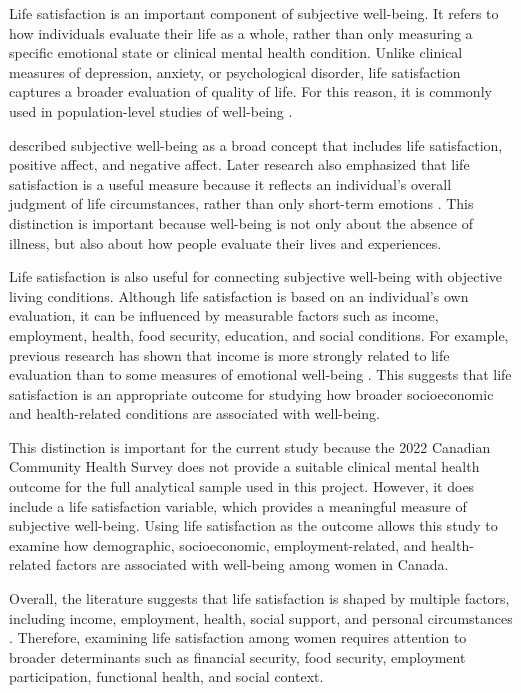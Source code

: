 \documentclass[12pt]{article}
\begin{document}
Life satisfaction is an important component of subjective well-being. It refers to how individuals evaluate their life as a whole, rather than only measuring a specific emotional state or clinical mental health condition. Unlike clinical measures of depression, anxiety, or psychological disorder, life satisfaction captures a broader evaluation of quality of life. For this reason, it is commonly used in population-level studies of well-being \citep{diener1984, diener1999}.

\citet{diener1984} described subjective well-being as a broad concept that includes life satisfaction, positive affect, and negative affect. Later research also emphasized that life satisfaction is a useful measure because it reflects an individual's overall judgment of life circumstances, rather than only short-term emotions \citep{diener1999, diener2013}. This distinction is important because well-being is not only about the absence of illness, but also about how people evaluate their lives and experiences.

Life satisfaction is also useful for connecting subjective well-being with objective living conditions. Although life satisfaction is based on an individual's own evaluation, it can be influenced by measurable factors such as income, employment, health, food security, education, and social conditions. For example, previous research has shown that income is more strongly related to life evaluation than to some measures of emotional well-being \citep{kahneman2010}. This suggests that life satisfaction is an appropriate outcome for studying how broader socioeconomic and health-related conditions are associated with well-being.

This distinction is important for the current study because the 2022 Canadian Community Health Survey does not provide a suitable clinical mental health outcome for the full analytical sample used in this project. However, it does include a life satisfaction variable, which provides a meaningful measure of subjective well-being. Using life satisfaction as the outcome allows this study to examine how demographic, socioeconomic, employment-related, and health-related factors are associated with well-being among women in Canada.

Overall, the literature suggests that life satisfaction is shaped by multiple factors, including income, employment, health, social support, and personal circumstances \citep{diener1984, diener1999, diener2013, kahneman2010}. Therefore, examining life satisfaction among women requires attention to broader determinants such as financial security, food security, employment participation, functional health, and social context.
\end{document}

